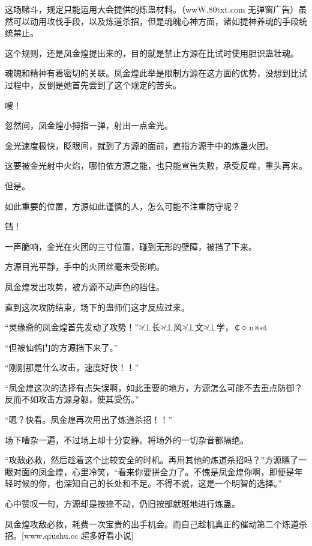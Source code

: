 
\begin{this_body}

这场赌斗，规定只能运用大会提供的炼蛊材料。（wwW.80txt.com 无弹窗广告）虽然可以动用攻伐手段，以及炼道杀招，但是魂魄心神方面，诸如提神养魂的手段统统禁止。

这个规则，还是凤金煌提出来的，目的就是禁止方源在比试时使用胆识蛊壮魂。

魂魄和精神有着密切的关联。凤金煌此举是限制方源在这方面的优势，没想到比试过程中，反倒是她首先尝到了这个规定的苦头。

嗖！

忽然间，凤金煌小拇指一弹，射出一点金光。

金光速度极快，眨眼间，就到了方源的面前，直指方源手中的炼蛊火团。

这要被金光射中火焰，哪怕依方源之能，也只能宣告失败，承受反噬，重头再来。

但是。

如此重要的位置，方源如此谨慎的人，怎么可能不注重防守呢？

铛！

一声脆响，金光在火团的三寸位置，碰到无形的壁障，被挡了下来。

方源目光平静，手中的火团丝毫未受影响。

凤金煌发出攻势，被方源不动声色的挡住。

直到这次攻防结束，场下的蛊师们这才反应过来。

“灵缘斋的凤金煌首先发动了攻势！”≯⊥长≯⊥风≯⊥文≯⊥学，￠○.n※et

“但被仙鹤门的方源挡下来了。”

“刚刚那是什么攻击，速度好快！！”

“凤金煌这次的选择有点失误啊，如此重要的地方，方源怎么可能不去重点防御？反而不如攻击方源身躯，使其受伤。”

“嗯？快看。凤金煌再次用出了炼道杀招！！”

场下嘈杂一遍，不过场上却十分安静。将场外的一切杂音都隔绝。

“攻敌必救，然后趁着这个比较安全的时机。再用其他的炼道杀招吗？”方源瞟了一眼对面的凤金煌，心里冷笑，“看来你要拼全力了。不愧是凤金煌你啊，即便是年轻时候的你，也深知自己的长处和不足。不得不说，这是一个明智的选择。”

心中赞叹一句，方源却是按捺不动，仍旧按部就班地进行炼蛊。

凤金煌攻敌必救，耗费一次宝贵的出手机会。而自己趁机真正的催动第二个炼道杀招。[www.qiushu.cc 超多好看小说]


\end{this_body}
